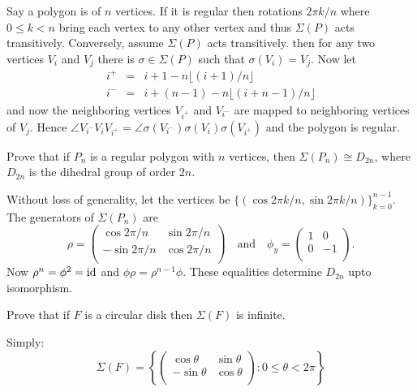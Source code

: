 \begin{myenumerate}
Say a polygon is of $n$ vertices.
If it is regular then rotations \(2\pi k/n\) where \(0\leq k < n\)
bring each vertex to any other vertex and thus \(\Sigma(P)\)
acts transitively.
Conversely, assume  \(\Sigma(P)\) acts transitively.
then for any two vertices \(V_i\) and \(V_j\)
there is \(\sigma\in\Sigma(P)\) such that
\(\sigma(V_i)=V_j\). Now let
\begin{eqnarray}
   i^{+} & = & i + 1 - n\lfloor(i+1)/n\rfloor \\
   i^{-} & = & i + (n - 1) - n\lfloor(i+n-1)/n\rfloor
\end{eqnarray}
and now the neighboring vertices
\(V_{i^{+}}\) and \(V_{i^{-}}\) are mapped to
neighboring vertices of \(V_j\).
Hence
\(\angle V_{i^{-}} V_i V_{i^{+}} =
  \angle \sigma(V_{i^{-}})\sigma(V_i)\sigma(V_{i^{+}})\)
and the polygon is regular.

\item
\begin{excopy}
Prove that if \(P_n\) is a regular polygon with $n$ vertices,
then \(\Sigma(P_n)\cong D_{2n}\),
where \(D_{2n}\) is the dihedral group of order \(2n\).
\end{excopy}

Without loss of generality,
let the vertices be \(\{(\cos 2\pi k/n, \sin 2\pi k/n)\}_{k=0}^{n-1}\).
The generators of \(\Sigma(P_n)\) are
\begin{equation}
  \rho = \left(
   \begin{array}{rl}
    \cos 2\pi/n & \sin 2\pi/n \\
    -\sin 2\pi/n  & \cos 2\pi/n \\
   \end{array}
  \right)
  \quad\textrm{and}\quad
  \phi_y = \left(
   \begin{array}{lr}
    1 &  0 \\
    0 & -1 \\
   \end{array}
  \right).
\end{equation}
Now \(\rho^n=\phi^2=\mathop{\rm id}\nolimits\) and \(\phi\rho = \rho^{n-1}\phi\).
These equalities determine \(D_{2n}\) upto isomorphism.

\item
\begin{excopy}
Prove that if $F$ is a circular disk then \(\Sigma(F)\) is infinite.
\end{excopy}

Simply:
\begin{equation}
\Sigma(F) =
   \left\{
      \left(
      \begin{array}{rl}
        \cos\theta & \sin\theta \\
       -\sin\theta & \cos\theta \\
      \end{array}
      \right): 0\leq\theta<2\pi
   \right\}
\end{equation}

\end{myenumerate}

